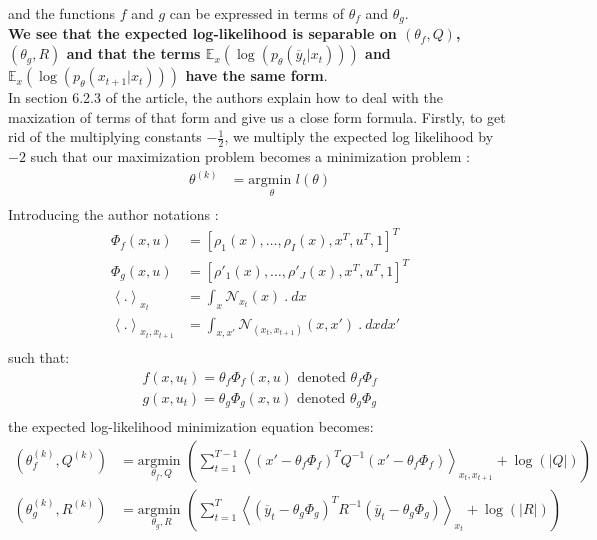 and the functions $f$ and $g$ can be expressed in terms of $\theta_f$ and $\theta_g$.\\

\textbf{We see that the expected log-likelihood is separable on $(\theta_f,Q)$, $(\theta_g,R)$ and that the terms $\mathbb{E}_x\left( \log(p_{\theta}(\overline{y}_t|x_t)) \right)$ and $\mathbb{E}_x(\log(p_{\theta}(x_{t+1}|x_t)))$ have the same form}.\\

In section 6.2.3 of the article, the authors explain how to deal with the maxization of terms of that form and give us a close form formula.
Firstly, to get rid of the multiplying constants $-\frac{1}{2}$, we multiply the expected log likelihood by $-2$ such that our maximization problem becomes a minimization problem :
\begin{align*}
  \theta^{(k)} &= \underset{\theta}{\text{argmin }}l(\theta)\\
\end{align*}
Introducing the author notations :
\begin{align*}
  \Phi_f(x, u) &= [\rho_1(x), \ldots , \rho_I(x), x^T, u^T, 1]^T\\
  \Phi_g(x, u) &= [\rho'_1(x), \ldots , \rho'_J(x), x^T, u^T, 1]^T\\
  \left< . \right>_{x_t} &= \int_x{\mathcal{N}_{x_t}(x) \  .\  dx}\\
  \left< . \right>_{x_t,x_{t+1}} &= \int_{x, x'}{\mathcal{N}_{(x_t, x_{t+1})}(x, x') \  . \  dx}dx'\\
\end{align*} %
such that:
\begin{align*}
  f(x,u_t) = \theta_f \Phi_f(x, u) \text{ denoted }\theta_f \Phi_f\\
  g(x,u_t) = \theta_g \Phi_g(x, u) \text{ denoted }\theta_g \Phi_g\\
\end{align*}
the expected log-likelihood minimization equation becomes:
\begin{align*}
  \left( \theta_f^{(k)},Q^{(k)} \right) &=
    \underset{\theta_f,Q}{\text{argmin }}{\left(
      \sum_{t=1}^{T-1}{\left< (x' - \theta_f\Phi_f)^T Q^{-1}(x' - \theta_f\Phi_f) \right>_{x_t,x_{t+1}}+\log(|Q|)}
    \right)}\\
  \left( \theta_g^{(k)}, R^{(k)} \right) &=
    \underset{\theta_g,R}{\text{argmin }}{\left(
      \sum_{t=1}^{T}{\left< (\overline{y}_{t} - \theta_g \Phi_g)^T R^{-1} (\overline{y}_{t} - \theta_g \Phi_g) \right>_{x_t}+\log(|R|)
    }\right)}\\
\end{align*}
